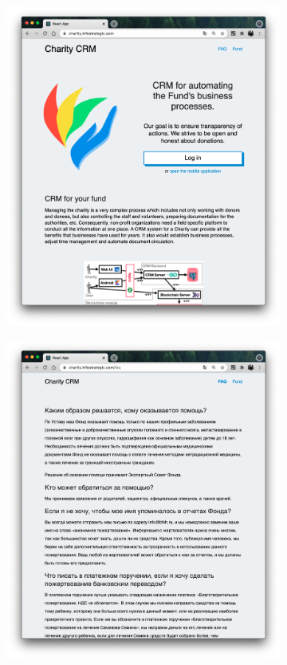 \documentclass[a4paper,12pt,reqno]{article}
\begin{document}
	\begin{figure}[H]
		\centering
		\begin{subfigure}[b]{0.475\linewidth}
			\includegraphics[width=\linewidth]{img/ro/landing.png}
		\end{subfigure}
		\begin{subfigure}[b]{0.475\linewidth}
			\includegraphics[width=\linewidth]{img/ro/faq_unauthorized.png}

\end{subfigure}
\end{figure}
\end{document}
